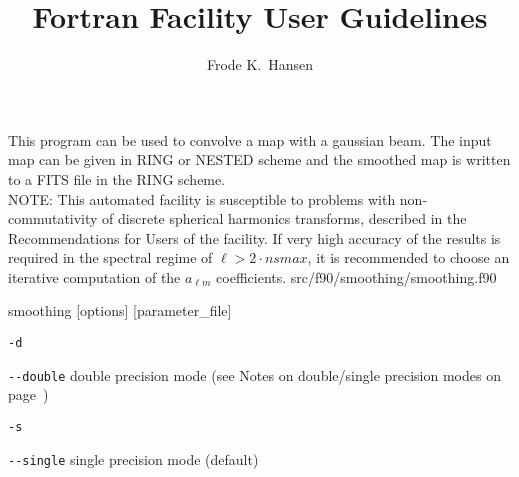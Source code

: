 
\sloppy


\title{\healpix Fortran Facility User Guidelines}
 \section[smoothing]{\nosectionname}
\label{fac:smoothing}
\author{Frode K.~Hansen}

\begin{facility}
{This program can be used to convolve a map with a gaussian beam. 
The input map can be given in RING or NESTED scheme and the smoothed map 
is written 
to a FITS file in the RING scheme.%
\\%
NOTE: This automated facility is susceptible to problems with non-commutativity
of discrete spherical harmonics transforms, described in the Recommendations
for Users of the  facility. 
If very high accuracy of the results is
required in the spectral regime of $\ell > 2\cdot nsmax$, it is recommended
to choose an iterative computation of the $a_{\ell m}$ coefficients.
} 
{src/f90/smoothing/smoothing.f90}
\end{facility}

\begin{f90facility}
{smoothing [options] [parameter\_file]}
\end{f90facility}


\begin{options}
  \begin{optionlistwide}{} %
    \item[{\tt -d}]
    \item[{\tt -}{\tt -}{\tt double}] double precision mode (see Notes on double/single precision modes on page~\pageref{page:ioprec})
    \item[{\tt -s}]
    \item[{\tt -}{\tt -}{\tt single}] single precision mode (default)
  \end{optionlistwide}
\end{options}

